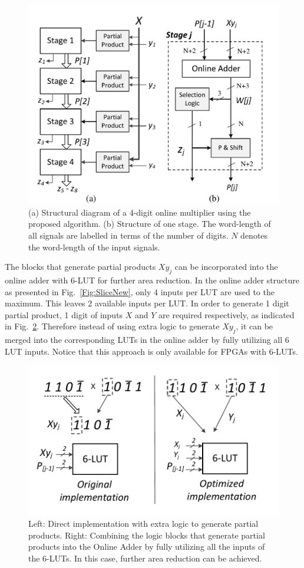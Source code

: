 \documentclass[conference]{IEEEtran}
\begin{document}
\begin{figure}[tbp]
	\centering
	\includegraphics[width=.5\textwidth]{./Figures/ParallelMult_Structure.pdf}
	\caption{(a) Structural diagram of a 4-digit online multiplier using the proposed algorithm. (b) Structure of one stage. The word-length of all signals are labelled in terms of the number of digits. $N$ denotes the word-length of the input signals.}
	\label{Fig:PMStructure}
\end{figure}

The blocks that generate partial products $Xy_j$ can be incorporated into the online adder with 6-LUT for further area reduction. In the online adder structure as presented in Fig.~\ref{Fig:SliceNew}, only 4 inputs per LUT are used to the maximum. This leaves 2 available inputs per LUT. In order to generate 1 digit partial product, 1 digit of inputs $X$ and $Y$ are required respectively, as indicated in Fig.~\ref{Fig:PartialProduct}. Therefore instead of using extra logic to generate $Xy_j$, it can be merged into the corresponding LUTs in the online adder by fully utilizing all 6 LUT inputs. Notice that this approach is only available for FPGAs with 6-LUTs.

\begin{figure}[tbp]
	\centering
	\includegraphics[width=.4\textwidth]{./Figures/PartialProduct.pdf}
	\caption{Left: Direct implementation with extra logic to generate partial products. Right: Combining the logic blocks that generate partial products into the Online Adder by fully utilizing all the inputs of the 6-LUTs. In this case, further area reduction can be achieved.}
	\label{Fig:PartialProduct}
\end{figure}
\end{document}
